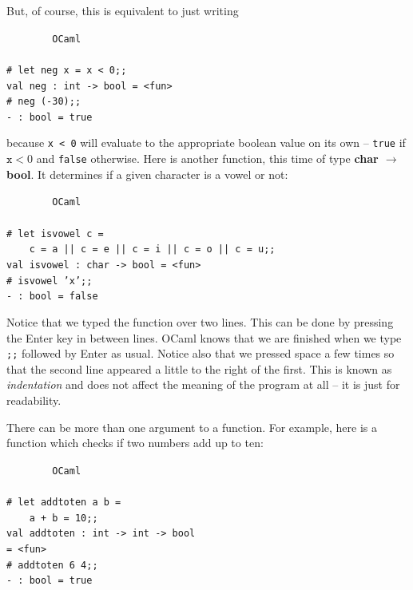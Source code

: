 \documentclass[]{book}
\newcommand\upquote[1]{\textquotesingle#1\textquotesingle}
\newcommand{\smspace}{\vspace{4mm}}
\begin{document}
\noindent But, of course, this is equivalent to just writing

\smspace
\noindent\verb!        OCaml!\\
\noindent\\
\noindent\verb!# let neg x = x < 0;;!\\
\noindent\verb!val neg : int -> bool = <fun>!\\
\noindent\texttt{\# neg (-30);;}\\
\noindent\verb!- : bool = true!
\smspace

\noindent because \texttt{x < 0} will evaluate to the appropriate boolean value on its own -- \texttt{true} if $\texttt{x} < 0$ and \texttt{false} otherwise. Here is another function, this time of type \textbf{\textrm{char $\rightarrow$ bool}}. It determines if a given character is a vowel or not:

\smspace
\noindent\verb!        OCaml!\\
\noindent\\
\noindent\verb!# let isvowel c =!\\
\noindent\mbox{\texttt{~~~~c = \upquote{a} || c = \upquote{e} || c = \upquote{i} || c = \upquote{o} || c = \upquote{u};;}}\\
\noindent\verb!val isvowel : char -> bool = <fun>!\\
\noindent\texttt{\# isvowel 'x';;}\\
\noindent\verb!- : bool = false!
\smspace

\noindent Notice that we typed the function over two lines. This can be done by pressing the Enter key in between lines. OCaml knows that we are finished when we type \texttt{;;} followed by Enter as usual. Notice also that we pressed space a few times so that the second line appeared a little to the right of the first. This is known as \textit{indentation} and does not affect the meaning of the program at all -- it is just for readability.

There can be more than one argument to a function. For example, here is a function which checks if two numbers add up to ten:

\smspace
\noindent\verb!        OCaml!\\
\noindent\\
\noindent\verb!# let addtoten a b =!\\
\noindent\verb!    a + b = 10;;!\\
\noindent\verb!val addtoten : int -> int -> bool!\\
\noindent\verb!= <fun>!\\
\noindent\texttt{\# addtoten 6 4;;}\\
\noindent\verb!- : bool = true!
\smspace
\end{document}
